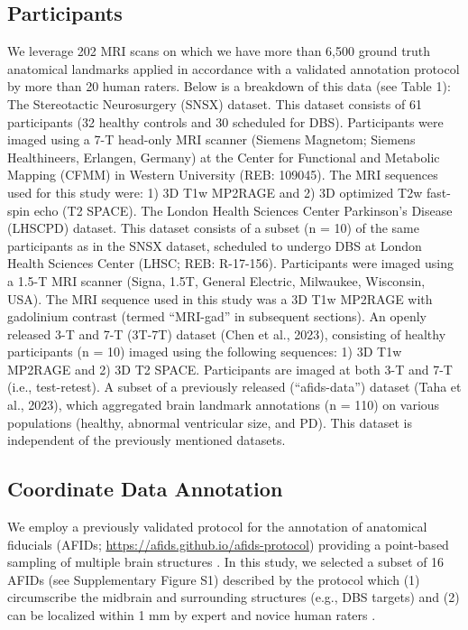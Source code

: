 \subsection{Participants}
We leverage 202 MRI scans on which we have more than 6,500 ground truth anatomical landmarks applied in accordance with a validated annotation protocol \cite{Lau2019-eh} by more than 20 human raters. Below is a breakdown of this data (see Table 1):
The Stereotactic Neurosurgery (SNSX) dataset. This dataset consists of 61 participants (32 healthy controls and 30 scheduled for DBS). Participants were imaged using a 7-T head-only MRI scanner (Siemens Magnetom; Siemens Healthineers, Erlangen, Germany) at the Center for Functional and Metabolic Mapping (CFMM) in Western University (REB: 109045). The MRI sequences used for this study were: 1) 3D T1w MP2RAGE  and 2) 3D optimized T2w fast-spin echo (T2 SPACE).
The London Health Sciences Center Parkinson’s Disease (LHSCPD) dataset. This dataset consists of a subset (n = 10) of the same participants as in the SNSX dataset, scheduled to undergo DBS at London Health Sciences Center (LHSC; REB: R-17-156). Participants were imaged using a 1.5-T MRI scanner (Signa, 1.5T, General Electric, Milwaukee, Wisconsin, USA). The MRI sequence used in this study was a 3D T1w MP2RAGE with gadolinium contrast (termed “MRI-gad” in subsequent sections).
An openly released 3-T and 7-T (3T-7T) dataset (Chen et al., 2023), consisting of healthy participants (n = 10) imaged using the following sequences: 1) 3D T1w MP2RAGE and 2) 3D T2 SPACE. Participants are imaged at both 3-T and 7-T (i.e., test-retest).
A subset of a previously released (“afids-data”) dataset (Taha et al., 2023), which aggregated brain landmark annotations (n = 110) on various populations (healthy, abnormal ventricular size, and PD). This dataset is independent of the previously mentioned datasets.


\subsection{Coordinate Data Annotation}
We employ a previously validated protocol for the annotation of anatomical fiducials (AFIDs; \url{https://afids.github.io/afids-protocol}) providing a point-based sampling of multiple brain structures \cite{lau2019}. In this study, we selected a subset of 16 AFIDs (see Supplementary Figure S1) described by the protocol which (1) circumscribe the midbrain and surrounding structures (e.g., DBS targets) and (2) can be localized within 1 mm by expert and novice human raters \cite{ref}.


